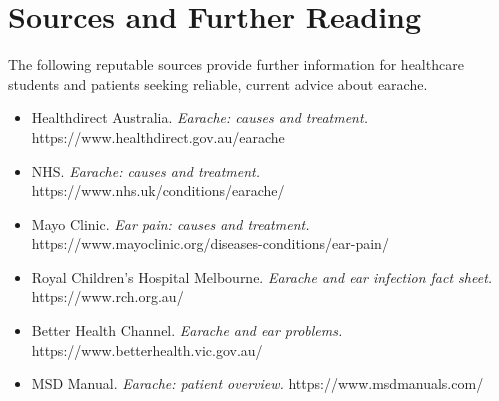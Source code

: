 \section*{Sources and Further Reading}
The following reputable sources provide further information for healthcare students and patients seeking reliable, current advice about earache.
\begin{itemize}
    \item Healthdirect Australia. \textit{Earache: causes and treatment.} https://www.healthdirect.gov.au/earache
    \item NHS. \textit{Earache: causes and treatment.} https://www.nhs.uk/conditions/earache/
    \item Mayo Clinic. \textit{Ear pain: causes and treatment.} https://www.mayoclinic.org/diseases-conditions/ear-pain/
    \item Royal Children's Hospital Melbourne. \textit{Earache and ear infection fact sheet.} https://www.rch.org.au/
    \item Better Health Channel. \textit{Earache and ear problems.} https://www.betterhealth.vic.gov.au/
    \item MSD Manual. \textit{Earache: patient overview.} https://www.msdmanuals.com/
\end{itemize}

